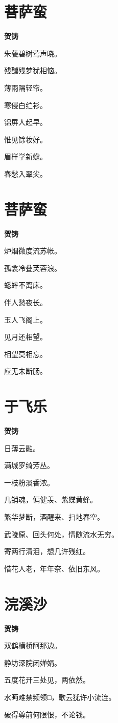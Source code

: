 \documentclass[12pt,a4paper]{ctexbook}
\begin{document}
\section{菩萨蛮}
\textbf{贺铸}\par\vspace{0.5em}
朱甍碧树莺声晓。\par
残醺残梦犹相恼。\par
薄雨隔轻帘。\par
寒侵白纻衫。\par
锦屏人起早。\par
惟见馀妆好。\par
眉样学新蟾。\par
春愁入翠尖。\par

\section{菩萨蛮}
\textbf{贺铸}\par\vspace{0.5em}
炉烟微度流苏帐。\par
孤衾冷叠芙蓉浪。\par
蟋蟀不离床。\par
伴人愁夜长。\par
玉人飞阁上。\par
见月还相望。\par
相望莫相忘。\par
应无未断肠。\par

\section{于飞乐}
\textbf{贺铸}\par\vspace{0.5em}
日薄云融。\par
满城罗绮芳丛。\par
一枝粉淡香浓。\par
几销魂，偏健羡、紫蝶黄蜂。\par
繁华梦断，酒醒来、扫地春空。\par
武陵原、回头何处，情随流水无穷。\par
寄两行清泪，想几许残红。\par
惜花人老，年年奈、依旧东风。\par

\section{浣溪沙}
\textbf{贺铸}\par\vspace{0.5em}
双鹤横桥阿那边。\par
静坊深院闭婵娟。\par
五度花开三处见，两依然。\par
水眄难禁频领□，歌云犹许小流连。\par
破得尊前何限恨，不论钱。\par
\end{document}
